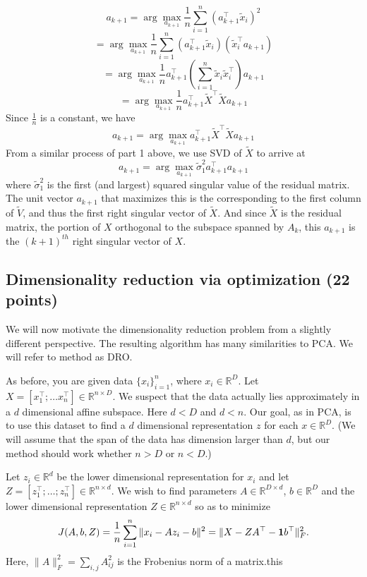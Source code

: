 \documentclass[a4paper]{article}
\newcounter{thm}
\newcommand*{\one}{{\bf 1}}
\theoremstyle{definition}
\newcommand{\RR}{\mathbb{R}}
\newenvironment{soln}{
	\leavevmode\color{blue}\ignorespaces
}{}
\begin{document}
\begin{enumerate}
\begin{soln}
	$$a_{k+1} = \arg \max_{a_{k+1}} \frac{1}{n} \sum_{i=1}^{n} (a_{k+1}^\top \tilde{x}_i)^2$$
	$$ = \arg \max_{a_{k+1}} \frac{1}{n} \sum_{i=1}^{n} (a_{k+1}^\top \tilde{x}_i)(\tilde{x}_i^\top a_{k+1})$$
	$$ = \arg \max_{a_{k+1}} \frac{1}{n} a_{k+1}^\top \left( \sum_{i=1}^{n} \tilde{x}_i \tilde{x}_i^\top\right) a_{k+1}$$
	$$ = \arg \max_{a_{k+1}} \frac{1}{n} a_{k+1}^\top \tilde{X}^\top \tilde{X} a_{k+1}$$
	Since $\frac{1}{n}$ is a constant, we have
	$$a_{k+1} = \arg \max_{a_{k+1}} a_{k+1}^\top \tilde{X}^\top \tilde{X} a_{k+1}$$
	From a similar process of part 1 above, we use SVD of $\tilde{X}$ to arrive at
	$$a_{k+1} = \arg \max_{a_{k+1}} \tilde{\sigma}_1^2 a_{k+1}^\top a_{k+1}$$
	where $\tilde{\sigma}_1^2$ is the first (and largest) squared singular value of the residual matrix. The unit vector $a_{k+1}$ that maximizes this is the corresponding to the first column of $\tilde{V}$, and thus the first right singular vector of $\tilde{X}$. And since $\tilde{X}$ is the residual matrix, the portion of $X$ orthogonal to the subspace spanned by $A_k$, this $a_{k+1}$ is the $(k+1)^{th}$ right singular vector of $X$.
\end{soln}

\end{enumerate}


\subsection{Dimensionality reduction via optimization (22 points)}

We will now motivate the dimensionality reduction problem from a slightly different
perspective. The resulting algorithm has many similarities to PCA.
We will refer to method as DRO.

As before, you are given data $\{x_i\}_{i=1}^n$, where $x_i \in \RR^D$. Let $X=[x_1^\top; \dots
x_n^\top] \in \RR^{n\times D}$. We suspect that the data
actually lies approximately in  a $d$ dimensional affine subspace.
Here $d<D$ and $d<n$.
Our goal, as in PCA, is to use this dataset to find a $d$ dimensional representation $z$ for each $x\in\RR^D$.
(We will assume that the span of the data has dimension larger than
$d$, but our method should work whether $n>D$ or $n<D$.)


Let $z_i\in \RR^d$ be the lower dimensional representation for $x_i$ and
let $Z = [z_1^\top; \dots; z_n^\top] \in \RR^{n\times d}$.
We wish to find parameters $A \in \RR^{D\times d}$, $b\in\RR^D$ and the lower
dimensional representation $Z\in \RR^{n\times d}$ so as to minimize 
\begin{equation}
J(A,b,Z) = \frac{1}{n} \sum_{i=1}^n \|x_i - Az_i - b\|^2 = \| X - ZA^\top - \one b^\top\|_F^2.
\label{eqn:dimobj}
\end{equation}
Here, $\|A\|^2_F = \sum_{i,j} A_{ij}^2$ is the Frobenius norm of a matrix.this 
\end{document}
